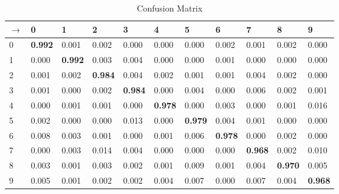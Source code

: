 \documentclass[11pt]{article}
\begin{document}
\begin{table}[ht]
\centering
\caption{Confusion Matrix}
\label{my-label}
\begin{tabular}{@{}lllllllllll@{}}
\toprule
  $\rightarrow$ & 0              & 1              & 2              & 3              & 4              & 5              & 6              & 7              & 8              & 9              \\ \midrule
0 & \textbf{0.992} & 0.001          & 0.002          & 0.000          & 0.000          & 0.000          & 0.002          & 0.001          & 0.002          & 0.000          \\
1 & 0.000          & \textbf{0.992} & 0.003          & 0.004          & 0.000          & 0.000          & 0.001          & 0.000          & 0.000          & 0.000          \\
2 & 0.001          & 0.002          & \textbf{0.984} & 0.004          & 0.002          & 0.001          & 0.001          & 0.004          & 0.002          & 0.000          \\
3 & 0.001          & 0.000          & 0.002          & \textbf{0.984} & 0.000          & 0.004          & 0.000          & 0.006          & 0.002          & 0.001          \\
4 & 0.000          & 0.001          & 0.001          & 0.000          & \textbf{0.978} & 0.000          & 0.003          & 0.000          & 0.001          & 0.016          \\
5 & 0.002          & 0.000          & 0.000          & 0.013          & 0.000          & \textbf{0.979} & 0.004          & 0.001          & 0.000          & 0.000          \\
6 & 0.008          & 0.003          & 0.001          & 0.000          & 0.001          & 0.006          & \textbf{0.978} & 0.000          & 0.002          & 0.000          \\
7 & 0.000          & 0.003          & 0.014          & 0.004          & 0.000          & 0.000          & 0.000          & \textbf{0.968} & 0.002          & 0.010          \\
8 & 0.003          & 0.001          & 0.003          & 0.002          & 0.001          & 0.009          & 0.001          & 0.004          & \textbf{0.970} & 0.005          \\
9 & 0.005          & 0.001          & 0.002          & 0.002          & 0.004          & 0.007          & 0.000          & 0.007          & 0.004          & \textbf{0.968} \\ \bottomrule
\end{tabular}
\end{table}
\end{document}
